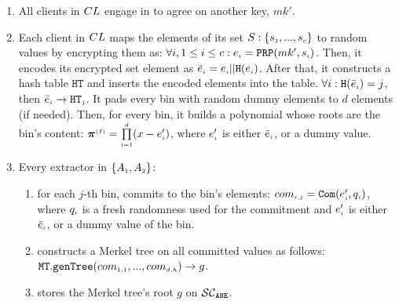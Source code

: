 \begin{enumerate}[leftmargin=5mm]
\item\label{e-psi::gen-mk-prime} All clients in ${CL}$ engage in \ct to agree on another key, $mk'$.
%
\item\label{Smart-PSI:encode-elem} Each client  in ${CL}$ maps the elements of its set $S:\{ s_{\scriptscriptstyle 1},..., s_{\scriptscriptstyle c}\}$ to random values by encrypting them as: $\forall i, 1\leq i\leq c: e_{\scriptscriptstyle i}=\mathtt{PRP}(mk', s_{\scriptscriptstyle i})$. 
%
Then, it encodes its encrypted set element as $\bar{e}_{\scriptscriptstyle i} =e_{\scriptscriptstyle i} || \mathtt{H}(e_{\scriptscriptstyle i})$.  
%
After that, it constructs a hash table  $\mathtt{HT}$ and inserts the encoded elements into the table. $\forall i: \mathtt{H}( \bar{e}_{\scriptscriptstyle i})={ {  {j}}}$, then $\bar{e}_{\scriptscriptstyle i}\rightarrow \mathtt{HT}_{\scriptscriptstyle {  {j}}}$. It pads every bin with random dummy elements to $d$ elements (if needed). Then,  for every bin, it builds a polynomial whose roots are the bin's content: $\bm\pi^{\scriptscriptstyle { {(I)}}}=\prod\limits^{\scriptscriptstyle d}_{\scriptscriptstyle i=1} (x-e'_{\scriptscriptstyle i})$, where $e'_{\scriptscriptstyle i}$ is either $\bar{e}_{\scriptscriptstyle i}$, or a dummy value. 




\item\label{merkel-tree-cons} Every extractor in $\{A_{\scriptscriptstyle 1}, A_{\scriptscriptstyle 2}\}$: 

\begin{enumerate}[leftmargin=2.5mm]
%
%
\item\label{smart-PSI::commit-to-bin} for each $j$-th bin, commits to the bin's elements: $com_{\scriptscriptstyle{i,j}}=\mathtt{Com}(e'_{\scriptscriptstyle i}, q_{\scriptscriptstyle i})$, where $q_{\scriptscriptstyle i}$ is a fresh randomness  used for the commitment and $e'_{\scriptscriptstyle i}$ is either $\bar{e}_{\scriptscriptstyle i}$, or a dummy value of the bin. %




\item  constructs a Merkel tree on all committed values as follows: \\$\mathtt{MT.genTree}(com_{\scriptscriptstyle 1,1},...,com_{\scriptscriptstyle d,h})\rightarrow g$. %
\item stores the Merkel tree's root $g$ on $\mathcal{SC}_{\mathtt{ANE}}$.
\end{enumerate}



\end{enumerate}
